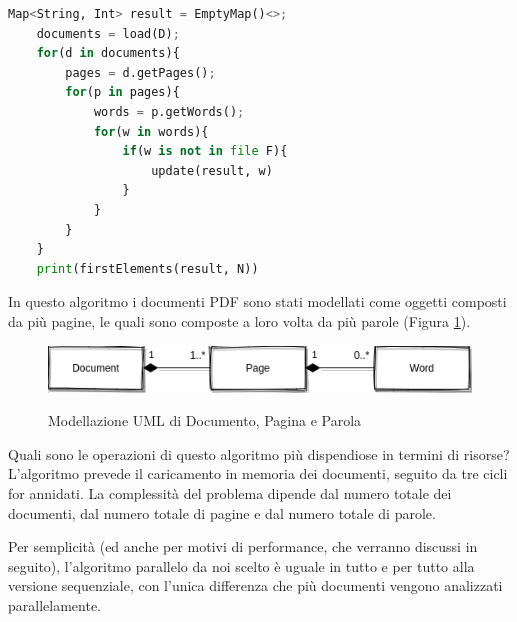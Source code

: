 \newpage
\begin{lstlisting}[language=Python, caption="Algoritmo semplice in pseudocodice di natura sequenziale (prima versione)"]
    Map<String, Int> result = EmptyMap()<>;
    documents = load(D);
    for(d in documents){
        pages = d.getPages();
        for(p in pages){
            words = p.getWords();
            for(w in words){
                if(w is not in file F){
                    update(result, w)
                }
            }
        }
    }
    print(firstElements(result, N))
\end{lstlisting}

\noindent In questo algoritmo i documenti PDF sono stati modellati come oggetti composti da più pagine, le quali sono composte a loro volta da più parole (Figura \ref{fig:doc-pag-wor}).

\begin{figure}[h!]
	\begin{center}
		\includegraphics[width=0.85\linewidth]{img/document-page-word.png}
		\label{fig:doc-pag-wor}
		\caption{Modellazione UML di Documento, Pagina e Parola}
	\end{center}
\end{figure}

\noindent Quali sono le operazioni di questo algoritmo più dispendiose in termini di risorse? L'algoritmo prevede il caricamento in memoria dei documenti, seguito da tre cicli for annidati. La complessità del problema dipende dal numero totale dei documenti, dal numero totale di pagine e dal numero totale di parole.\newline

\noindent Per semplicità (ed anche per motivi di performance, che verranno discussi in seguito), l'algoritmo parallelo da noi scelto è uguale in tutto e per tutto alla versione sequenziale, con l'unica differenza che più documenti vengono analizzati parallelamente.
